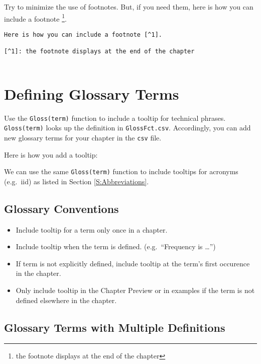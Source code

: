 \documentclass[
]{book}
\providecommand{\tightlist}{%
  \setlength{\itemsep}{0pt}\setlength{\parskip}{0pt}}
\begin{document}
Try to minimize the use of footnotes. But, if you need them, here is how you can include a footnote \footnote{the footnote displays at the end of the chapter}.

\begin{verbatim}
Here is how you can include a footnote [^1].
    
[^1]: the footnote displays at the end of the chapter
    
\end{verbatim}

\hypertarget{defining-glossary-terms}{%
\section{Defining Glossary Terms}\label{defining-glossary-terms}}

Use the \texttt{Gloss(term)} function to include a tooltip for technical phrases. \texttt{Gloss(term)} looks up the definition in \texttt{GlossFct.csv}. Accordingly, you can add new glossary terms for your chapter in the \texttt{csv} file.

Here is how you add a tooltip:

We can use the same \texttt{Gloss(term)} function to include tooltips for acronyms (e.g.~iid) as listed in Section \ref{S:Abbreviations}.

\hypertarget{glossary-conventions}{%
\subsection{Glossary Conventions}\label{glossary-conventions}}

\begin{itemize}
\tightlist
\item
  Include tooltip for a term only once in a chapter.
\item
  Include tooltip when the term is defined. (e.g.~``Frequency is \ldots{}'')
\item
  If term is not explicitly defined, include tooltip at the term's first occurence in the chapter.
\item
  Only include tooltip in the Chapter Preview or in examples if the term is not defined elsewhere in the chapter.
\end{itemize}

\hypertarget{glossary-terms-with-multiple-definitions}{%
\subsection{Glossary Terms with Multiple Definitions}\label{glossary-terms-with-multiple-definitions}}
\end{document}
